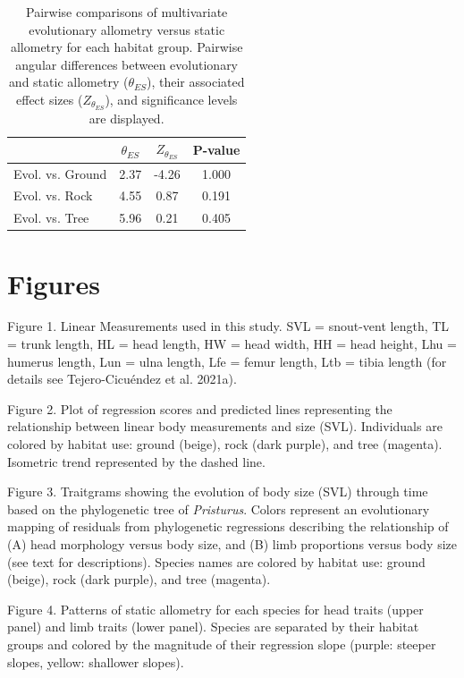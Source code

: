 \documentclass[
  11pt,
]{article}
\begin{document}
\begin{table}[H]

\caption{\label{tab:unnamed-chunk-3}Pairwise comparisons of multivariate evolutionary allometry versus static allometry for each habitat group. Pairwise angular differences between evolutionary and static allometry ($\theta_{ES}$), their associated effect sizes ($Z_{\theta_{ES}}$), and significance levels are displayed.}
\centering
\begin{tabular}[t]{lccc}
\toprule
  & $\theta_{ES}$ & $Z_{\theta_{ES}}$ & P-value\\
\midrule
Evol. vs. Ground & 2.37 & -4.26 & 1.000\\
Evol. vs. Rock & 4.55 & 0.87 & 0.191\\
Evol. vs. Tree & 5.96 & 0.21 & 0.405\\
\bottomrule
\end{tabular}
\end{table}

\newpage

\hypertarget{figures}{%
\section{Figures}\label{figures}}

Figure 1. Linear Measurements used in this study. SVL = snout-vent
length, TL = trunk length, HL = head length, HW = head width, HH = head
height, Lhu = humerus length, Lun = ulna length, Lfe = femur length, Ltb
= tibia length (for details see Tejero-Cicuéndez et al. 2021a).

Figure 2. Plot of regression scores and predicted lines representing the
relationship between linear body measurements and size (SVL).
Individuals are colored by habitat use: ground (beige), rock (dark
purple), and tree (magenta). Isometric trend represented by the dashed
line.

Figure 3. Traitgrams showing the evolution of body size (SVL) through
time based on the phylogenetic tree of \emph{Pristurus}. Colors
represent an evolutionary mapping of residuals from phylogenetic
regressions describing the relationship of (A) head morphology versus
body size, and (B) limb proportions versus body size (see text for
descriptions). Species names are colored by habitat use: ground (beige),
rock (dark purple), and tree (magenta).

Figure 4. Patterns of static allometry for each species for head traits
(upper panel) and limb traits (lower panel). Species are separated by
their habitat groups and colored by the magnitude of their regression
slope (purple: steeper slopes, yellow: shallower slopes).
\end{document}
